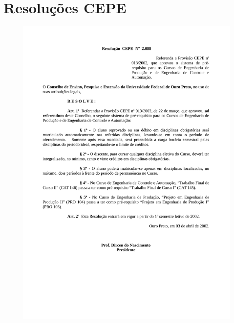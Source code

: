 \chapter{Resoluções CEPE} 
\label{ape:02} 
\begin{figure}[p]
	\centering 
	\includegraphics[scale=0.7]{capitulos/resolucoes/cepe2088.pdf}
\end{figure}

